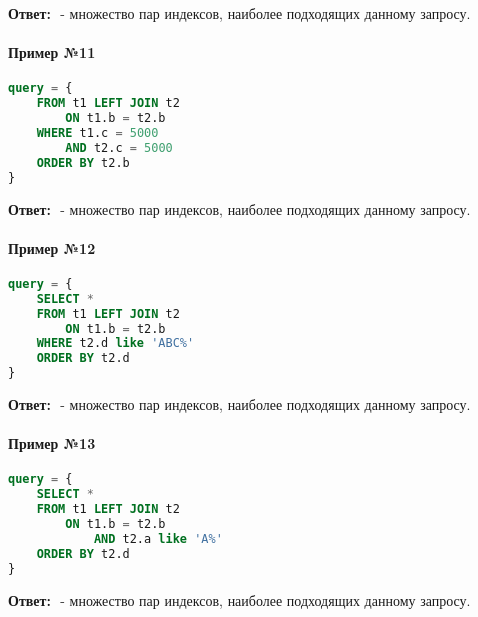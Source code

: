 \textbf{Ответ:} ${}$ - множество пар индексов, наиболее подходящих данному запросу.


\paragraph{Пример №11}
\begin{lstlisting}[language=SQL]
query = {
    FROM t1 LEFT JOIN t2
        ON t1.b = t2.b
    WHERE t1.c = 5000
        AND t2.c = 5000
    ORDER BY t2.b
}
\end{lstlisting}

\textbf{Ответ:} ${}$ - множество пар индексов, наиболее подходящих данному запросу.


\paragraph{Пример №12}
\begin{lstlisting}[language=SQL]
query = {
    SELECT *
    FROM t1 LEFT JOIN t2
        ON t1.b = t2.b
    WHERE t2.d like 'ABC%'
    ORDER BY t2.d
}
\end{lstlisting}

\textbf{Ответ:} ${}$ - множество пар индексов, наиболее подходящих данному запросу.


\paragraph{Пример №13}
\begin{lstlisting}[language=SQL]
query = {
    SELECT *
    FROM t1 LEFT JOIN t2
        ON t1.b = t2.b
            AND t2.a like 'A%'
    ORDER BY t2.d
}
\end{lstlisting}

\textbf{Ответ:} ${}$ - множество пар индексов, наиболее подходящих данному запросу.